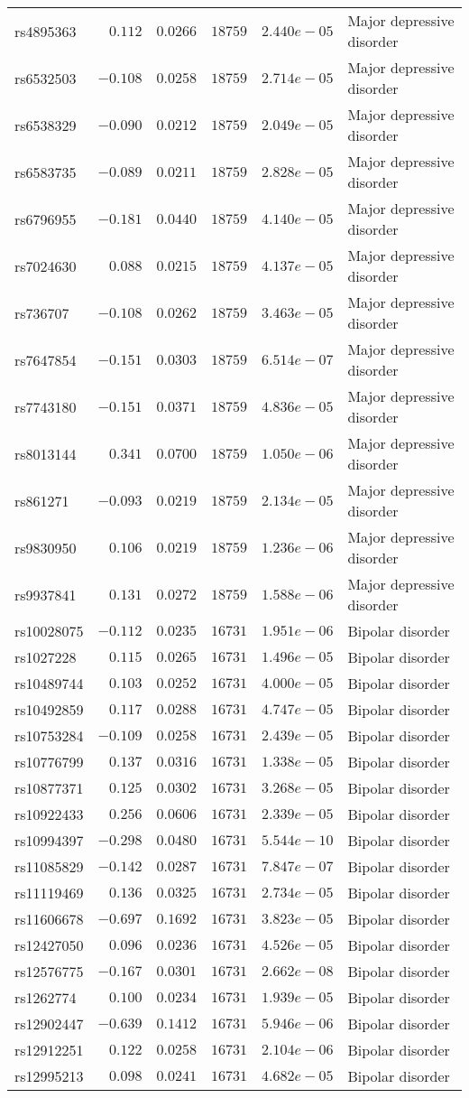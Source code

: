 \begin{tabular}{lrrrrl}
rs4895363&$ 0.112$&$0.0266$&$ 18759$&$2.440e-05$&Major depressive disorder\tabularnewline
rs6532503&$-0.108$&$0.0258$&$ 18759$&$2.714e-05$&Major depressive disorder\tabularnewline
rs6538329&$-0.090$&$0.0212$&$ 18759$&$2.049e-05$&Major depressive disorder\tabularnewline
rs6583735&$-0.089$&$0.0211$&$ 18759$&$2.828e-05$&Major depressive disorder\tabularnewline
rs6796955&$-0.181$&$0.0440$&$ 18759$&$4.140e-05$&Major depressive disorder\tabularnewline
rs7024630&$ 0.088$&$0.0215$&$ 18759$&$4.137e-05$&Major depressive disorder\tabularnewline
rs736707&$-0.108$&$0.0262$&$ 18759$&$3.463e-05$&Major depressive disorder\tabularnewline
rs7647854&$-0.151$&$0.0303$&$ 18759$&$6.514e-07$&Major depressive disorder\tabularnewline
rs7743180&$-0.151$&$0.0371$&$ 18759$&$4.836e-05$&Major depressive disorder\tabularnewline
rs8013144&$ 0.341$&$0.0700$&$ 18759$&$1.050e-06$&Major depressive disorder\tabularnewline
rs861271&$-0.093$&$0.0219$&$ 18759$&$2.134e-05$&Major depressive disorder\tabularnewline
rs9830950&$ 0.106$&$0.0219$&$ 18759$&$1.236e-06$&Major depressive disorder\tabularnewline
rs9937841&$ 0.131$&$0.0272$&$ 18759$&$1.588e-06$&Major depressive disorder\tabularnewline
rs10028075&$-0.112$&$0.0235$&$ 16731$&$1.951e-06$&Bipolar disorder\tabularnewline
rs1027228&$ 0.115$&$0.0265$&$ 16731$&$1.496e-05$&Bipolar disorder\tabularnewline
rs10489744&$ 0.103$&$0.0252$&$ 16731$&$4.000e-05$&Bipolar disorder\tabularnewline
rs10492859&$ 0.117$&$0.0288$&$ 16731$&$4.747e-05$&Bipolar disorder\tabularnewline
rs10753284&$-0.109$&$0.0258$&$ 16731$&$2.439e-05$&Bipolar disorder\tabularnewline
rs10776799&$ 0.137$&$0.0316$&$ 16731$&$1.338e-05$&Bipolar disorder\tabularnewline
rs10877371&$ 0.125$&$0.0302$&$ 16731$&$3.268e-05$&Bipolar disorder\tabularnewline
rs10922433&$ 0.256$&$0.0606$&$ 16731$&$2.339e-05$&Bipolar disorder\tabularnewline
rs10994397&$-0.298$&$0.0480$&$ 16731$&$5.544e-10$&Bipolar disorder\tabularnewline
rs11085829&$-0.142$&$0.0287$&$ 16731$&$7.847e-07$&Bipolar disorder\tabularnewline
rs11119469&$ 0.136$&$0.0325$&$ 16731$&$2.734e-05$&Bipolar disorder\tabularnewline
rs11606678&$-0.697$&$0.1692$&$ 16731$&$3.823e-05$&Bipolar disorder\tabularnewline
rs12427050&$ 0.096$&$0.0236$&$ 16731$&$4.526e-05$&Bipolar disorder\tabularnewline
rs12576775&$-0.167$&$0.0301$&$ 16731$&$2.662e-08$&Bipolar disorder\tabularnewline
rs1262774&$ 0.100$&$0.0234$&$ 16731$&$1.939e-05$&Bipolar disorder\tabularnewline
rs12902447&$-0.639$&$0.1412$&$ 16731$&$5.946e-06$&Bipolar disorder\tabularnewline
rs12912251&$ 0.122$&$0.0258$&$ 16731$&$2.104e-06$&Bipolar disorder\tabularnewline
rs12995213&$ 0.098$&$0.0241$&$ 16731$&$4.682e-05$&Bipolar disorder\tabularnewline

\end{tabular}
